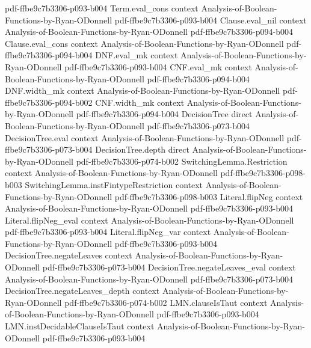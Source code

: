 \begin{lemma}
  {pdf-ffbe9c7b3306-p093-b004}
\proofstep
  {Term.eval_cons}
  {context}
  {Analysis-of-Boolean-Functions-by-Ryan-ODonnell}
  {pdf-ffbe9c7b3306-p093-b004}
\proofstep
  {Clause.eval_nil}
  {context}
  {Analysis-of-Boolean-Functions-by-Ryan-ODonnell}
  {pdf-ffbe9c7b3306-p094-b004}
\proofstep
  {Clause.eval_cons}
  {context}
  {Analysis-of-Boolean-Functions-by-Ryan-ODonnell}
  {pdf-ffbe9c7b3306-p094-b004}
\proofstep
  {DNF.eval_mk}
  {context}
  {Analysis-of-Boolean-Functions-by-Ryan-ODonnell}
  {pdf-ffbe9c7b3306-p093-b004}
\proofstep
  {CNF.eval_mk}
  {context}
  {Analysis-of-Boolean-Functions-by-Ryan-ODonnell}
  {pdf-ffbe9c7b3306-p094-b004}
\proofstep
  {DNF.width_mk}
  {context}
  {Analysis-of-Boolean-Functions-by-Ryan-ODonnell}
  {pdf-ffbe9c7b3306-p094-b002}
\proofstep
  {CNF.width_mk}
  {context}
  {Analysis-of-Boolean-Functions-by-Ryan-ODonnell}
  {pdf-ffbe9c7b3306-p094-b004}
\proofstep
  {DecisionTree}
  {direct}
  {Analysis-of-Boolean-Functions-by-Ryan-ODonnell}
  {pdf-ffbe9c7b3306-p073-b004}
\proofstep
  {DecisionTree.eval}
  {context}
  {Analysis-of-Boolean-Functions-by-Ryan-ODonnell}
  {pdf-ffbe9c7b3306-p073-b004}
\proofstep
  {DecisionTree.depth}
  {direct}
  {Analysis-of-Boolean-Functions-by-Ryan-ODonnell}
  {pdf-ffbe9c7b3306-p074-b002}
\proofstep
  {SwitchingLemma.Restriction}
  {context}
  {Analysis-of-Boolean-Functions-by-Ryan-ODonnell}
  {pdf-ffbe9c7b3306-p098-b003}
\proofstep
  {SwitchingLemma.instFintypeRestriction}
  {context}
  {Analysis-of-Boolean-Functions-by-Ryan-ODonnell}
  {pdf-ffbe9c7b3306-p098-b003}
\proofstep
  {Literal.flipNeg}
  {context}
  {Analysis-of-Boolean-Functions-by-Ryan-ODonnell}
  {pdf-ffbe9c7b3306-p093-b004}
\proofstep
  {Literal.flipNeg_eval}
  {context}
  {Analysis-of-Boolean-Functions-by-Ryan-ODonnell}
  {pdf-ffbe9c7b3306-p093-b004}
\proofstep
  {Literal.flipNeg_var}
  {context}
  {Analysis-of-Boolean-Functions-by-Ryan-ODonnell}
  {pdf-ffbe9c7b3306-p093-b004}
\proofstep
  {DecisionTree.negateLeaves}
  {context}
  {Analysis-of-Boolean-Functions-by-Ryan-ODonnell}
  {pdf-ffbe9c7b3306-p073-b004}
\proofstep
  {DecisionTree.negateLeaves_eval}
  {context}
  {Analysis-of-Boolean-Functions-by-Ryan-ODonnell}
  {pdf-ffbe9c7b3306-p073-b004}
\proofstep
  {DecisionTree.negateLeaves_depth}
  {context}
  {Analysis-of-Boolean-Functions-by-Ryan-ODonnell}
  {pdf-ffbe9c7b3306-p074-b002}
\proofstep
  {LMN.clauseIsTaut}
  {context}
  {Analysis-of-Boolean-Functions-by-Ryan-ODonnell}
  {pdf-ffbe9c7b3306-p093-b004}
\proofstep
  {LMN.instDecidableClauseIsTaut}
  {context}
  {Analysis-of-Boolean-Functions-by-Ryan-ODonnell}
  {pdf-ffbe9c7b3306-p093-b004}

\end{lemma}
